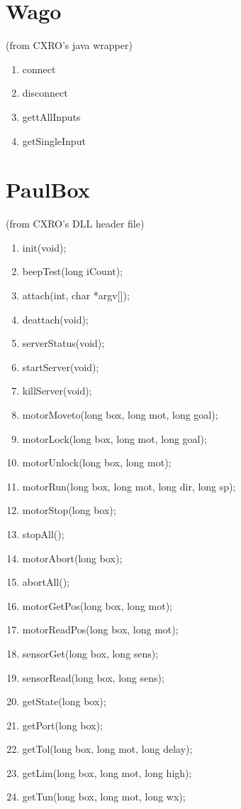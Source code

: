 \documentclass[10pt,letter,twoside]{report}
\begin{document}
\section{Wago}
(from CXRO's java wrapper)
\begin{enumerate}
\item connect
\item disconnect
\item gettAllInputs
\item getSingleInput
\end{enumerate}

\section{PaulBox}
(from CXRO's DLL header file)
\begin{enumerate}
\item init(void);
\item beepTest(long iCount);
\item attach(int, char *argv[]);
\item deattach(void);
\item serverStatus(void);
\item startServer(void);
\item killServer(void);
\item motorMoveto(long box, long mot, long goal);
\item motorLock(long box, long mot, long goal);
\item motorUnlock(long box, long mot);
\item motorRun(long box, long mot, long dir, long sp);
\item motorStop(long box);
\item stopAll();
\item motorAbort(long box);
\item abortAll();
\item motorGetPos(long box, long mot);
\item motorReadPos(long box, long mot);
\item sensorGet(long box, long sens);
\item sensorRead(long box, long sens);
\item getState(long box);
\item getPort(long box);
\item getTol(long box, long mot, long delay);
\item getLim(long box, long mot, long high);
\item getTun(long box, long mot, long wx);

\end{enumerate}
\end{document}
